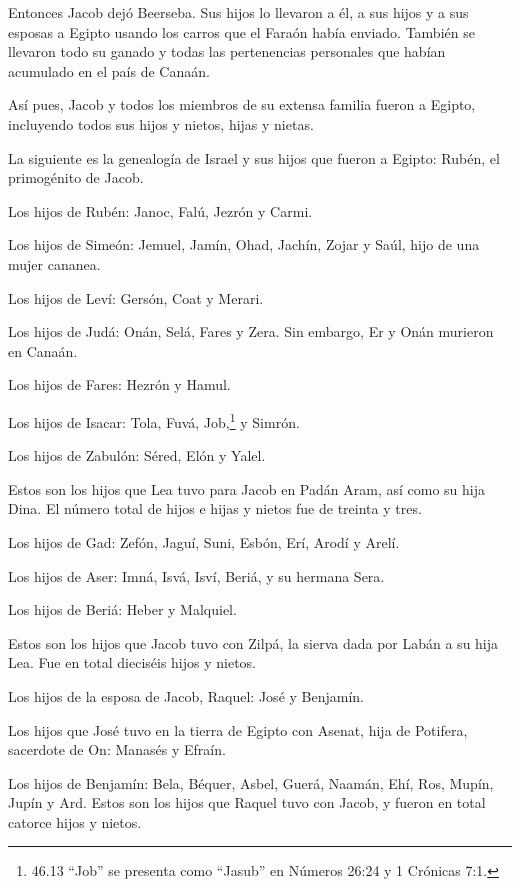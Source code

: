  Entonces Jacob dejó Beerseba. Sus hijos lo llevaron a él, a
sus hijos y a sus esposas a Egipto usando los carros que el Faraón había
enviado.  También se llevaron todo su ganado y todas las
pertenencias personales que habían acumulado en el país de Canaán.

Así pues, Jacob y todos los miembros de su extensa familia fueron a
Egipto,  incluyendo todos sus hijos y nietos, hijas y
nietas.

 La siguiente es la genealogía de Israel y sus hijos que
fueron a Egipto: Rubén, el primogénito de Jacob.

 Los hijos de Rubén: Janoc, Falú, Jezrón y Carmi.

 Los hijos de Simeón: Jemuel, Jamín, Ohad, Jachín, Zojar y
Saúl, hijo de una mujer cananea.

 Los hijos de Leví: Gersón, Coat y Merari.

 Los hijos de Judá: Onán, Selá, Fares y Zera. Sin embargo,
Er y Onán murieron en Canaán.

Los hijos de Fares: Hezrón y Hamul.

 Los hijos de Isacar: Tola, Fuvá, Job,\footnote{46.13
  ``Job'' se presenta como ``Jasub'' en Números 26:24 y 1 Crónicas 7:1.}
y Simrón.

 Los hijos de Zabulón: Séred, Elón y Yalel.

 Estos son los hijos que Lea tuvo para Jacob en Padán Aram,
así como su hija Dina. El número total de hijos e hijas y nietos fue de
treinta y tres.

 Los hijos de Gad: Zefón, Jaguí, Suni, Esbón, Erí, Arodí y
Arelí.

 Los hijos de Aser: Imná, Isvá, Isví, Beriá, y su hermana
Sera.

Los hijos de Beriá: Heber y Malquiel.

 Estos son los hijos que Jacob tuvo con Zilpá, la sierva
dada por Labán a su hija Lea. Fue en total dieciséis hijos y nietos.

 Los hijos de la esposa de Jacob, Raquel: José y Benjamín.

 Los hijos que José tuvo en la tierra de Egipto con Asenat,
hija de Potifera, sacerdote de On: Manasés y Efraín.

 Los hijos de Benjamín: Bela, Béquer, Asbel, Guerá, Naamán,
Ehí, Ros, Mupín, Jupín y Ard.  Estos son los hijos que
Raquel tuvo con Jacob, y fueron en total catorce hijos y nietos.

